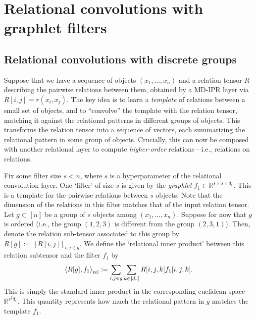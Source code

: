\section{Relational convolutions with graphlet filters}\label{sec:relconv}

\subsection{Relational convolutions with discrete groups}\label{ssec:relconv_discrete_groups}
Suppose that we have a sequence of objects $(x_1, \ldots, x_n)$ and a relation tensor $R$ describing the pairwise relations between them, obtained by a MD-IPR layer via $R[i,j] = r(x_i, x_j)$. The key idea is to learn a \textit{template} of relations between a small set of objects, and to ``convolve'' the template with the relation tensor, matching it against the relational patterns in different groups of objects. This transforms the relation tensor into a sequence of vectors, each summarizing the relational pattern in some group of objects. Crucially, this can now be composed with another relational layer to compute \textit{higher-order} relations---i.e., relations on relations.

Fix some filter size $s < n$, where $s$ is a hyperparameter of the relational convolution layer. One `filter' of size $s$ is given by the \textit{graphlet} $f_1 \in \mathbb{R}^{s \times s \times d_r}$. This is a template for the pairwise relations between $s$ objects. Note that the dimension of the relations in this filter matches that of the input relation tensor. Let $g \subset [n]$ be a group of $s$ objects among $(x_1, \ldots, x_n)$. Suppose for now that $g$ is ordered (i.e., the group $(1, 2, 3)$ is different from the group $(2, 3, 1)$). Then, denote the relation sub-tensor associated to this group by $R[g] := [R[i,j]]_{i,j \in g}$. We define the `relational inner product' between this relation subtensor and the filter $f_1$ by
\begin{equation}\label{eq:relational_inner_prod_one_filt}
    \left\langle R[g], f_1 \right\rangle_\mathrm{rel} \coloneqq \sum_{i,j \in g} \sum_{k \in [d_r]} R[i,j,k] f_1[i,j,k].
\end{equation}
This is simply the standard inner product in the corresponding euclidean space $\mathbb{R}^{s^2 d_r}$. This quantity represents how much the relational pattern in $g$ matches the template $f_1$.



